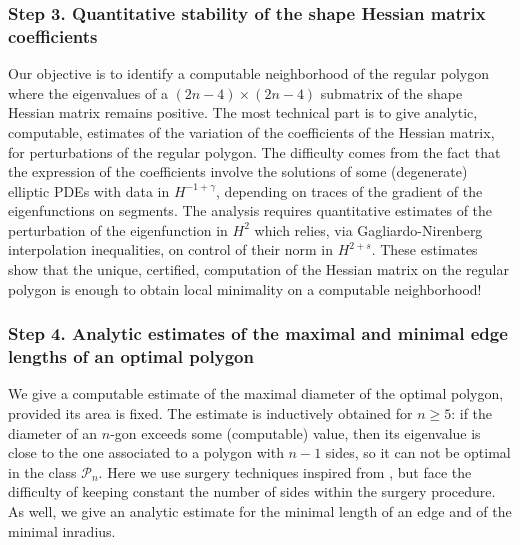 \documentclass[11pt]{article}
\newcommand{\Subsubsection}{\subsubsection}
\numberwithin{equation}{section}\newtheorem*{jepEnonce}{\jepEnonceTitle}\newenvironment{enonce*}[1]{\def\jepEnonceTitle{#1}\jepEnonce}{\endjepEnonce}\newtheorem*{conj*}{Conjecture}
\theoremstyle{plain}
\theoremstyle{definition}
\begin{document}
\subsubsection*{Step 3. Quantitative stability of the shape Hessian matrix coefficients}
Our objective is to identify a computable neighborhood of the regular polygon where the eigenvalues of a $(2n-4)\times (2n-4)$ submatrix of the shape Hessian matrix remains positive. The most technical part is to give analytic, computable, estimates of the variation of the coefficients of the Hessian matrix, for perturbations of the regular polygon. The difficulty comes from the fact that the expression of the coefficients involve the solutions of some (degenerate) elliptic PDEs with data in $H^{-1+\gamma}$, depending on traces of the gradient of the eigenfunctions on segments. The analysis requires quantitative estimates of the perturbation of the eigenfunction in $H^2$ which relies, via Gagliardo-Nirenberg interpolation inequalities, on control of their norm in $H^{2+s}$.
These estimates
show that the unique, certified, computation of the Hessian matrix on the regular polygon is enough to obtain local minimality on a computable neighborhood!

\Subsubsection*{Step 4. Analytic estimates of the maximal and minimal edge lengths of an optimal polygon}
We give a computable estimate of the maximal diameter of the optimal polygon, provided its area is fixed. The estimate is inductively obtained for $n \ge 5$: if the diameter of an $n$-gon exceeds some (computable) value, then its eigenvalue is close to the one associated to a polygon with $n-1$ sides, so it can not be optimal in the class ${\mathcal P}_n$. Here we use surgery techniques inspired from \cite{BuMa15}, but face the difficulty of keeping constant the number of sides within the surgery procedure.
As well, we give an analytic estimate for the minimal length of an edge and of the minimal inradius.
\end{document}
